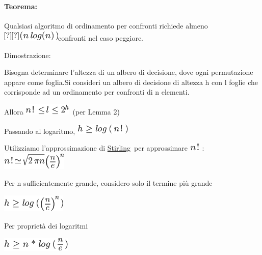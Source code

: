 \documentclass{article}
\let\oldparagraph\paragraph
\renewcommand{\paragraph}[1]{\oldparagraph{#1}\mbox{}}
\begin{document}
{~~~~~~~~}

\hypertarget{h.hr66c3ikhdcj}{\paragraph{\texorpdfstring{{Teorema:}}{Teorema:}}\label{h.hr66c3ikhdcj}}

{Qualsiasi algoritmo di ordinamento per confronti richiede almeno
}\includegraphics{images/image153.png}{confronti nel caso peggiore.}

{}

{Dimostrazione:}

{Bisogna determinare l'altezza di un albero di decisione, dove ogni
permutazione appare come foglia.Si consideri un albero di decisione di
altezza h con l foglie che corrisponde ad un ordinamento per confronti
di n ele}{menti. }

{Allora }\includegraphics{images/image173.png}{~(per Lemma 2)}

{Passando al logaritmo, }\includegraphics{images/image174.png}

{Utilizziamo l'approssimazione di
}{\href{https://www.google.com/url?q=https://it.wikipedia.org/wiki/Approssimazione_di_Stirling\&sa=D\&ust=1523379128517000}{Stirling}}{~per
approssimare }\includegraphics{images/image160.png}{~:
}\includegraphics{images/image175.png}{~}

{Per n sufficientemente grande, considero solo il termine più grande}

\includegraphics{images/image176.png}

{Per proprietà dei logaritmi}

\includegraphics{images/image177.png}
\end{document}
